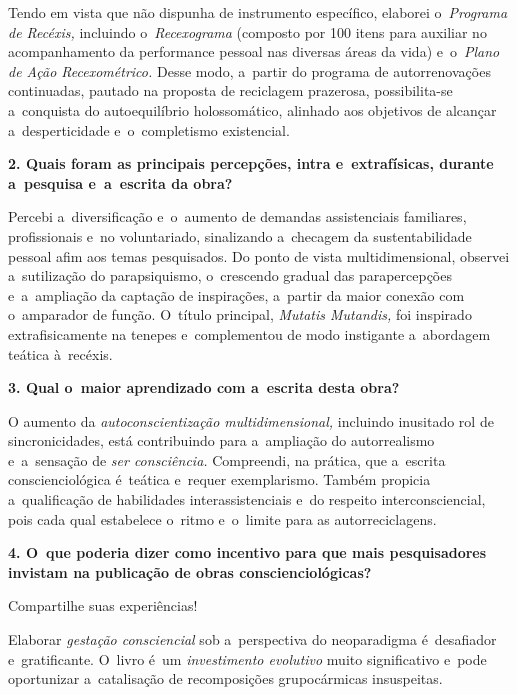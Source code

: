 \documentclass{gescons}
\begin{document}
\begin{multicols}{2}
Tendo em vista que não dispunha de instrumento específico, elaborei o~\emph{Programa de Recéxis,} incluindo o~\emph{Recexograma} (composto por 100 itens para auxiliar no acompanhamento da performance pessoal nas diversas áreas da vida) e~o~\emph{Plano de Ação Recexométrico.} Desse modo, a~partir do programa de autorrenovações continuadas, pautado na proposta de reciclagem prazerosa, possibilita-se a~conquista do autoequilíbrio holossomático, alinhado aos objetivos de alcançar a~desperticidade e~o~completismo existencial.

\textbf{2. Quais foram as principais percepções, intra e~extrafísicas, durante a~pesquisa e~a~escrita da obra?}

Percebi a~diversificação e~o~aumento de demandas assistenciais familiares, profissionais e~no voluntariado, sinalizando a~checagem da sustentabilidade pessoal afim aos temas pesquisados. Do ponto de vista multidimensional, observei a~sutilização do parapsiquismo, o~crescendo gradual das parapercepções e~a~ampliação da captação de inspirações, a~partir da maior conexão com o~amparador de função. O~título principal, \emph{Mutatis Mutandis,} foi inspirado extrafisicamente na tenepes e~complementou de modo instigante a~abordagem teática à~recéxis.

\textbf{3. Qual o~maior aprendizado com a~escrita desta obra?}

O aumento da \emph{autoconscientização multidimensional,} incluindo inusitado rol de sincronicidades, está contribuindo para a~ampliação do autorrealismo e~a~sensação de \emph{ser consciência.} Compreendi, na prática, que a~escrita conscienciológica é~teática e~requer exemplarismo. Também propicia a~qualificação de habilidades interassistenciais e~do respeito interconsciencial, pois cada qual estabelece o~ritmo e~o~limite para as autorreciclagens.

\textbf{4. O~que poderia dizer como incentivo para que mais pesquisadores invistam na publicação de obras conscienciológicas?}

Compartilhe suas experiências!

Elaborar \emph{gestação consciencial} sob a~perspectiva do neoparadigma é~desafiador e~gratificante. O~livro é~um \emph{investimento evolutivo} muito significativo e~pode oportunizar a~catalisação de recomposições grupocármicas insuspeitas.

% 
    
    \end{multicols}
\end{document}
